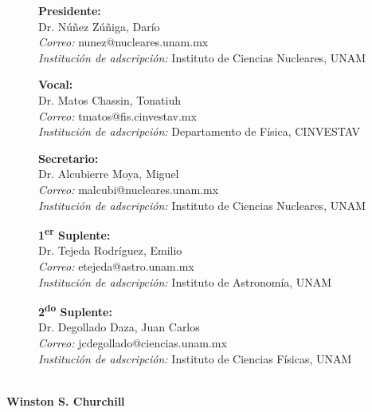 \documentclass[11pt,twoside,openright,spanish]{report}
\numberwithin{equation}{chapter}
\numberwithin{figure}{chapter}
\numberwithin{table}{chapter}
\newenvironment{changemargin}[3]{
	\begin{list}{}{
			\setlength{\topsep}{#3}
			\setlength{\leftmargin}{#1}
			\setlength{\rightmargin}{#2}
			\setlength{\listparindent}{\parindent}
			\setlength{\itemindent}{\parindent}
			\setlength{\parsep}{\parskip}
		}
		\item[]}{\end{list}}
\begin{document}
\begin{changemargin}{1cm}{0cm}{1cm}
\begin{description}
			\item[]\textbf{Presidente:}\\
			Dr. Núñez Zúñiga, Darío\\
			\textit{Correo:} nunez@nucleares.unam.mx\\
			\textit{Institución de adscripción:} Instituto de Ciencias Nucleares, UNAM
			\item[]\textbf{Vocal:}\\
			Dr. Matos Chassin, Tonatiuh\\
			\textit{Correo:} tmatos@fis.cinvestav.mx \\
			\textit{Institución de adscripción:} Departamento de Física, CINVESTAV
			\item[]\textbf{Secretario:}\\
			Dr. Alcubierre Moya, Miguel\\
			\textit{Correo:} malcubi@nucleares.unam.mx\\
			\textit{Institución de adscripción:} Instituto de Ciencias Nucleares, UNAM
			\item[]\textbf{1\textsuperscript{er} Suplente:}\\
			Dr. Tejeda Rodríguez, Emilio\\
			\textit{Correo:} etejeda@astro.unam.mx\\
			\textit{Institución de adscripción:} Instituto de Astronomía, UNAM
			\item[]\textbf{2\textsuperscript{do} Suplente:}\\
			Dr. Degollado Daza, Juan Carlos\\
			\textit{Correo:} jcdegollado@ciencias.unam.mx\\
			\textit{Institución de adscripción:} Instituto de Ciencias Físicas, UNAM
		\end{description}
		\thispagestyle{empty}
	\end{changemargin}
	
	
	\ChTitleVar{\raggedright\Large\sffamily\bfseries}
	
	\evensidemargin 0in 
	\oddsidemargin 0.6in
	
	\newpage{\ } 
	\thispagestyle{empty}
	
	\begin{dedication}
		{\Large{}}\\
		\vspace{0.5cm}
		{\normalsize{\bfseries{Winston S. Churchill}}}
	\end{dedication}
	
\end{document}
